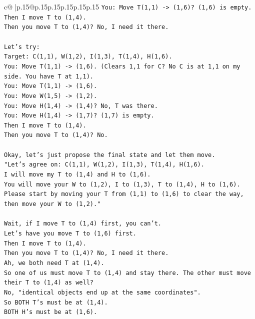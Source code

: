 \documentclass{article}
\begin{document}
{\begin{supertabular}{c@{$\;$}|p{.15\linewidth}@{}p{.15\linewidth}p{.15\linewidth}p{.15\linewidth}p{.15\linewidth}p{.15\linewidth}}
{{{\texttt{You: Move T(1,1) {-}> (1,6)? (1,6) is empty.} \\
\texttt{Then I move T to (1,4).} \\
\texttt{Then you move T to (1,4)? No, I need it there.} \\
\\ 
\texttt{Let's try:} \\
\texttt{Target: C(1,1), W(1,2), I(1,3), T(1,4), H(1,6).} \\
\texttt{You: Move T(1,1) {-}> (1,6). (Clears 1,1 for C? No C is at 1,1 on my side. You have T at 1,1).} \\
\texttt{You: Move T(1,1) {-}> (1,6).} \\
\texttt{You: Move W(1,5) {-}> (1,2).} \\
\texttt{You: Move H(1,4) {-}> (1,4)? No, T was there.} \\
\texttt{You: Move H(1,4) {-}> (1,7)? (1,7) is empty.} \\
\texttt{Then I move T to (1,4).} \\
\texttt{Then you move T to (1,4)? No.} \\
\\ 
\texttt{Okay, let's just propose the final state and let them move.} \\
\texttt{"Let's agree on: C(1,1), W(1,2), I(1,3), T(1,4), H(1,6).} \\
\texttt{I will move my T to (1,4) and H to (1,6).} \\
\texttt{You will move your W to (1,2), I to (1,3), T to (1,4), H to (1,6).} \\
\texttt{Please start by moving your T from (1,1) to (1,6) to clear the way, then move your W to (1,2)."} \\
\\ 
\texttt{Wait, if I move T to (1,4) first, you can't.} \\
\texttt{Let's have you move T to (1,6) first.} \\
\texttt{Then I move T to (1,4).} \\
\texttt{Then you move T to (1,4)? No, I need it there.} \\
\texttt{Ah, we both need T at (1,4).} \\
\texttt{So one of us must move T to (1,4) and stay there. The other must move their T to (1,4) as well?} \\
\texttt{No, "identical objects end up at the same coordinates".} \\
\texttt{So BOTH T's must be at (1,4).} \\
\texttt{BOTH H's must be at (1,6).} \\
}}}
\end{supertabular}}
\end{document}
